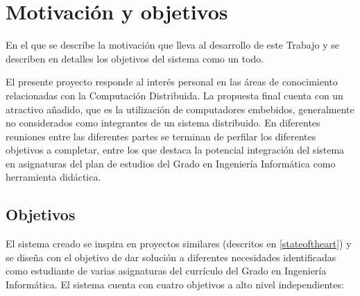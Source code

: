 \chapter{Motivación y objetivos}

\begin{cabstract}
En el que se describe la motivación que lleva al desarrollo de este Trabajo y se describen en detalles los objetivos del sistema como un todo.
\end{cabstract}

El presente proyecto responde al interés personal en las áreas de conocimiento relacionadas con la Computación Distribuida. La propuesta final cuenta con un atractivo añadido, que es la utilización de computadores embebidos, generalmente no considerados como integrantes de un sistema distribuido. En diferentes reuniones entre las diferentes partes se terminan de perfilar los diferentes objetivos a completar, entre los que destaca la potencial integración del sistema en asignaturas del plan de estudios del Grado en Ingeniería Informática como herramienta didáctica.

\section{Objetivos}

El sistema creado se inspira en proyectos similares (descritos en \ref{stateoftheart}) y se diseña con el objetivo de dar solución a diferentes necesidades identificadas como estudiante de varias asignaturas del currículo del Grado en Ingeniería Informática. El sistema cuenta con cuatro objetivos a alto nivel independientes:

